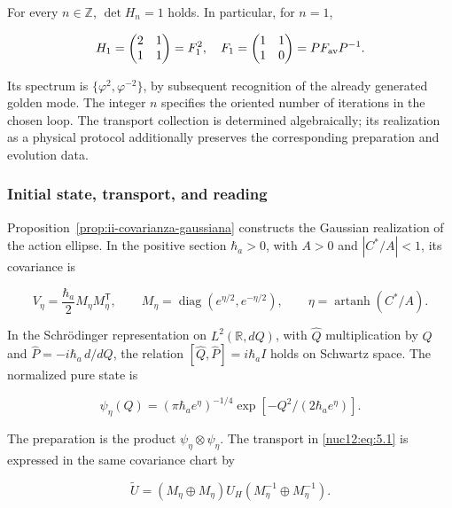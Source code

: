 For every \(n\in\mathbb Z\), \(\det H_n=1\) holds. In particular, for \(n=1\),

\begin{equation}
H_1=\begin{pmatrix}2&1\\1&1\end{pmatrix}
=F_1^2,\quad F_1=\begin{pmatrix}1&1\\1&0\end{pmatrix}
=P F_{\rm av}P^{-1}.
\label{nuc12:eq:5.3}
\end{equation}

Its spectrum is \(\{\varphi^2,\varphi^{-2}\}\), by subsequent recognition of the already generated golden mode. The integer \(n\) specifies the oriented number of iterations in the chosen loop. The transport collection is determined algebraically; its realization as a physical protocol additionally preserves the corresponding preparation and evolution data.

\subsubsection{Initial state, transport, and reading}

Proposition~\ref{prop:ii-covarianza-gaussiana} constructs the Gaussian realization of the action ellipse. In the positive section \(\hbar_a>0\), with \(A>0\) and \(|C^*/A|<1\), its covariance is

\begin{equation}
V_\eta=\frac{\hbar_a}{2}M_\eta M_\eta^{\mathsf T},\qquad
M_\eta=\operatorname{diag}(e^{\eta/2},e^{-\eta/2}),\qquad
\eta=\operatorname{artanh}(C^*/A).
\label{nuc12:eq:5.4}
\end{equation}

In the Schrödinger representation on \(L^2(\mathbb R,dQ)\), with \(\widehat Q\) multiplication by \(Q\) and \(\widehat P=-i\hbar_a\,d/dQ\), the relation \([\widehat Q,\widehat P]=i\hbar_a I\) holds on Schwartz space. The normalized pure state is

\[
\psi_\eta(Q)=(\pi\hbar_a e^\eta)^{-1/4}
\exp[-Q^2/(2\hbar_a e^\eta)].
\]

The preparation is the product \(\psi_\eta\otimes\psi_\eta\). The transport in \eqref{nuc12:eq:5.1} is expressed in the same covariance chart by

\begin{equation}
\widetilde U=(M_\eta\oplus M_\eta)U_H
(M_\eta^{-1}\oplus M_\eta^{-1}).
\label{nuc12:eq:5.5}
\end{equation}

